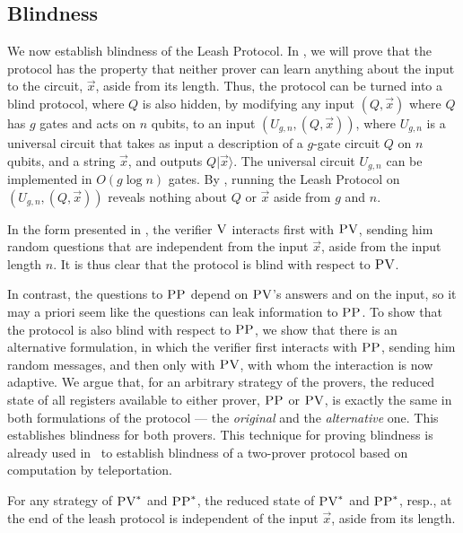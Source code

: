 \documentclass{toc}
\newcommand{\ket}[1]{|#1\rangle}
\newcommand{\ver}{\textsc{V}}
\newcommand{\pv}{\textsc{PV}}
\newcommand{\pp}{\textsc{PP}}
\begin{document}
\subsection{Blindness}
\label{sec:leash-blind}

We now establish blindness of the Leash Protocol. In , we will prove that the protocol has the property that neither prover can learn anything about the input to the circuit, $\vec{x}$, aside from its length. Thus, the protocol can be turned into a blind protocol, where $Q$ is also hidden, by modifying any input $(Q,\vec{x})$ where $Q$ has $g$ gates and acts on $n$ qubits, to an input $(U_{g,n},(Q,\vec{x}))$, where $U_{g,n}$ is a universal circuit that takes as input a description of a $g$-gate circuit $Q$ on $n$ qubits, and a string $\vec{x}$, and outputs $Q\ket{\vec{x}}$. The universal circuit $U_{g,n}$ can be implemented in $O(g\log n)$ gates. By , running the Leash Protocol on $(U_{g,n},(Q,\vec{x}))$ reveals nothing about $Q$ or $\vec{x}$ aside from $g$ and $n$.

In the form presented in , the verifier $\ver$ interacts first with $\pv$, sending him random questions that are independent from the input $\vec{x}$, aside from the input length $n$. It is thus clear that the protocol is blind with respect to $\pv$. 

In contrast, the questions to $\pp$ depend on $\pv$'s answers and on the input, so it may a priori seem like the questions can leak information to $\pp$. To show that the protocol is also blind with respect to $\pp$, we show that there is an alternative formulation, in which the verifier first interacts with $\pp$, sending him random messages, and then only with $\pv$, with whom the interaction is now adaptive. We argue that, for an arbitrary strategy of the provers, the reduced state of all registers available to either prover, $\pp$ or $\pv$, is exactly the same in both formulations of the protocol --- the \emph{original} and the \emph{alternative} one. This establishes blindness for both provers. This technique for proving blindness is already used in~\cite{reichardt2012classical} to establish blindness of a two-prover protocol based on computation by teleportation. 

\begin{lemma}\label{lem:blindness}
For any strategy of $\pv^*$ and $\pp^*$, the reduced state of $\pv^*$
and $\pp^*$, resp.,  %
at the end of the leash protocol
is independent of the input $\vec{x}$, aside from its length.
\end{lemma}
\end{document}
